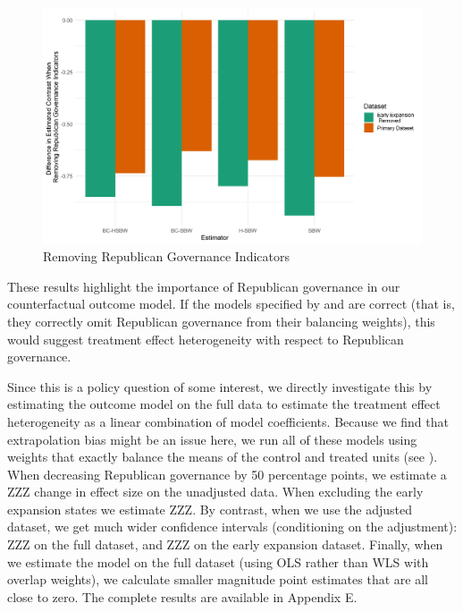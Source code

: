 \begin{figure}[H]
\begin{center}
    \caption{Removing Republican Governance Indicators}
    \label{fig:repub}
    \includegraphics[scale=0.6]{01_Plots/repub-diff-c1c2.png}
\end{center}
\end{figure}

These results highlight the importance of Republican governance in our counterfactual outcome model. If the models specified by \cite{kaestner2017effects} and \cite{courtemanche2017early} are correct (that is, they correctly omit Republican governance from their balancing weights), this would suggest treatment effect heterogeneity with respect to Republican governance. 

Since this is a policy question of some interest, we directly investigate this by estimating the outcome model on the full data to estimate the treatment effect heterogeneity as a linear combination of model coefficients. Because we find that extrapolation bias might be an issue here, we run all of these models using weights that exactly balance the means of the control and treated units (see \cite{li2018balancing}). When decreasing Republican governance by 50 percentage points, we estimate a ZZZ change in effect size on the unadjusted data. When excluding the early expansion states we estimate ZZZ. By contrast, when we use the adjusted dataset, we get much wider confidence intervals (conditioning on the adjustment): ZZZ on the full dataset, and ZZZ on the early expansion dataset. Finally, when we estimate the model on the full dataset (using OLS rather than WLS with overlap weights), we calculate smaller magnitude point estimates that are all close to zero. The complete results are available in Appendix E.